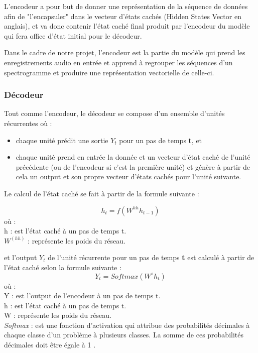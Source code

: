 L'encodeur a pour but de donner une représentation de la séquence de données afin de "l'encapsuler" dans le vecteur d'états cachés (Hidden States Vector en anglais), et va donc contenir l'état caché final produit par l'encodeur du modèle qui fera office d'état initial pour le décodeur.

Dans le cadre de notre projet, l'encodeur est la partie du modèle qui prend les enregistrements audio en entrée et apprend à regrouper les séquences d'un spectrogramme et produire une représentation vectorielle de celle-ci.

\subsubsection{Décodeur}
Tout comme l'encodeur, le décodeur se compose d'un ensemble d'unités récurrentes \cite{encoderdecoder} où : 
\begin{itemize}
    \item chaque unité prédit une sortie \textbf{$Y_{t}$} pour un pas de temps \textbf{t}, et
    \item chaque unité prend en entrée la donnée et un vecteur d'état caché de l'unité précédente (ou de l'encodeur si c'est la première unité) et génère à partir de cela un output et son propre vecteur d'états cachés pour l'unité suivante.\\
\end{itemize}

Le calcul de l'état caché se fait à partir de la formule suivante :

\begin{equation}
    h_{t} = f(W^{hh}h_{t-1})
\end{equation}
    où :\\ 
    h : est l'état caché à un pas de temps t. \\
    $W^{(hh)}$ : représente les poids du réseau.
    
et l'output {$Y_{t}$} de l'unité récurrente pour un pas de temps \textbf{t} est calculé à partir de l'état caché selon la formule suivante :
\begin{equation}
    Y_{t} = Softmax(W^{s}h_{t})
\end{equation}
où :\\
    Y : est l'output de l'encodeur à un pas de temps t. \\
    h : est l'état caché à un pas de temps t. \\
    W : représente les poids du réseau. \\
    \textit{Softmax} : est une fonction d'activation qui attribue des probabilités décimales à chaque classe d'un problème à plusieurs classes. La somme de ces probabilités décimales doit être égale à 1 \cite{softmax}.

